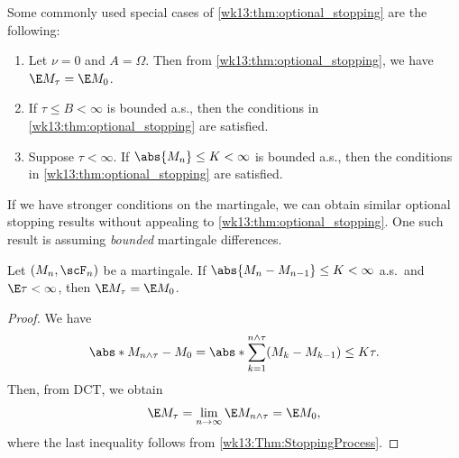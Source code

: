 \documentclass[../aipt.tex]{subfiles}
\begin{document}
%
Some commonly used special cases of \cref{wk13:thm:optional_stopping} are the following:
\begin{enumerate}
\item Let $\nu=0$ and  $A = \Omega$. Then from \cref{wk13:thm:optional_stopping}, we have  $\E M_\tau = \E M_0$.
\item If $\tau \leq B < \infty$ is bounded a.s., then the conditions in \cref{wk13:thm:optional_stopping} are satisfied.
\item Suppose $\tau <\infty$. If $\abs{M_n} \leq K < \infty$ is bounded a.s., then the conditions in \cref{wk13:thm:optional_stopping} are satisfied.
\end{enumerate}

If we have stronger conditions on the martingale, we can obtain similar optional stopping results without appealing to \cref{wk13:thm:optional_stopping}. One such result is assuming \emph{bounded} martingale differences. 
\begin{Lemma}\label{wk13:lem:M_bdd_diff}
Let $(M_n, \scF_n)$ be a martingale. If $\abs{M_n - M_{n-1}} \leq K <\infty$ a.s.\ and $\E \tau < \infty$, then $\E M_\tau = \E M_0$. 
\end{Lemma}
\begin{proof}
We have
\begin{align*}
\abs*{M_{n \wedge \tau} - M_0} = \abs*{\sum_{k=1}^{n \wedge \tau} (M_k - M_{k-1})} \leq K\tau.
\end{align*}
Then, from DCT, we obtain
\begin{align*}
\E M_\tau = \lim_{n \to \infty} \E M_{n \wedge \tau} = \E M_0,
\end{align*}
where the last inequality follows from \cref{wk13:Thm:StoppingProcess}.
\end{proof}
%
\end{document}
